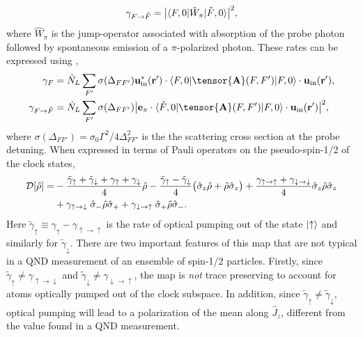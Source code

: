 \documentclass[preprint,aps,pra,onecolumn]{revtex4-1} %
\newcommand{\inp}{{\rm in}}
\newcommand{\gammauu}{\gamma_{\uparrow \rightarrow \uparrow}}
\newcommand{\gammadd}{\gamma_{\downarrow \rightarrow \downarrow}}
\newcommand{\gammaud}{\gamma_{\uparrow \rightarrow \downarrow}}
\newcommand{\gammadu}{\gamma_{\downarrow \rightarrow \uparrow}}
\newcommand{\gammau}{\gamma_{\uparrow}}
\newcommand{\gammad}{\gamma_{\downarrow}}
\newcommand{\gammap}{\tilde{\gamma}_\uparrow + \tilde{\gamma}_\downarrow}
\newcommand{\gammam}{\tilde{\gamma}_\uparrow - \tilde{\gamma}_\downarrow}
\newcommand{\change}[1]{{\color{RoyalBlue} #1}}
\begin{document}
	\begin{equation}
		\gamma_{F \rightarrow \tilde{F} } =\big| \langle{F,0}\rvert \hat{W}_\pi \lvert{\tilde{F},0}\rangle \big|^2,
	\end{equation}
where $\hat{W}_\pi$ is the jump-operator associated with absorption of the probe photon followed by spontaneous emission of a $\pi$-polarized photon.  These rates can be expressed using ,
	\begin{align}
		\gamma_F &=\dot{N}_L  \sum_{F'} \sigma (\Delta_{FF'} ) \mathbf{u}^*_\inp(\br')\cdot \bra{F,0} \tensor{\mathbf{A}}(F,F') \ket{F,0}  \cdot \mathbf{u}_\inp(\br'), \\
		\gamma_{F \rightarrow \tilde{F}}&=  \dot{N}_L  \sum_{F'} \sigma (\Delta_{FF'}) \big| \mathbf{e}_\pi\cdot \bra{\tilde{F},0} \tensor{\mathbf{A}}(F,F') \ket{F,0}  \cdot \mathbf{u}_\inp(\br') \big|^2 ,
	\end{align}
where $ \sigma (\Delta_{FF'} )  = \sigma_0 \Gamma^2/4\Delta^2_{FF'}$ is the the scattering cross section at the probe detuning.  When expressed in terms of Pauli operators on the pseudo-spin-1/2 of the clock states,
	\change{ \begin{align} \label{Eq::OpticalPumpingMapSchr}
		\mathcal{D}[\hat{\rho}]   =& -\frac{\gammap +\gammau+  \gammad }{4} \hat{\rho} - \frac{\gammam}{4} \big( \hat{\sigma}_z \hat{\rho} + \hat{\rho} \hat{\sigma}_z \big)+ \frac{\gammauu+\gammadd}{4} \hat{\sigma}_z \hat{\rho} \hat{\sigma}_z \\
		&+ \gammaud \; \hat{\sigma}_- \hat{\rho} \hat{\sigma}_+ + \gammadu \; \hat{\sigma}_+\hat{\rho} \hat{\sigma}_- . \nn
	\end{align} }
Here $\tilde{\gamma}_\uparrow  \equiv \gamma_\uparrow - \gamma_{\uparrow \rightarrow \uparrow}$ is the rate of optical pumping out of the state $\lvert{\uparrow}\rangle$ and similarly for $\tilde{\gamma}_\downarrow$.
There are two important features of this map that are not typical in a QND measurement of an ensemble of spin-1/2 particles.  Firstly, since $\tilde{\gamma}_\uparrow \neq \gamma_{\uparrow \rightarrow \downarrow}$ and  $\tilde{\gamma}_\downarrow \neq \gamma_{\downarrow \rightarrow \uparrow}$, the map is {\em not} trace preserving to account for atoms optically pumped out of the clock subspace.  In addition, since $\tilde{\gamma}_\uparrow \neq \tilde{\gamma}_\downarrow$, optical pumping will lead to a polarization of the mean along $\hat{J}_z$, different from the value found in a QND measurement.
		
\end{document}
